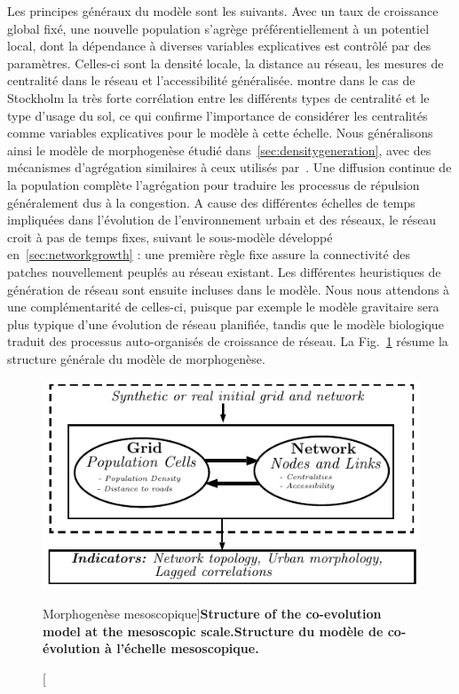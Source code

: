 {Les principes généraux du modèle sont les suivants. Avec un taux de croissance global fixé, une nouvelle population s'agrège préférentiellement à un potentiel local, dont la dépendance à diverses variables explicatives est contrôlé par des paramètres. Celles-ci sont la densité locale, la distance au réseau, les mesures de centralité dans le réseau et l'accessibilité généralisée. \cite{doi:10.1080/13658816.2014.893347} montre dans le cas de Stockholm la très forte corrélation entre les différents types de centralité et le type d'usage du sol, ce qui confirme l'importance de considérer les centralités comme variables explicatives pour le modèle à cette échelle. Nous généralisons ainsi le modèle de morphogenèse étudié dans~\ref{sec:densitygeneration}, avec des mécanismes d'agrégation similaires à ceux utilisés par~\cite{raimbault2014hybrid}. Une diffusion continue de la population complète l'agrégation pour traduire les processus de répulsion généralement dus à la congestion. A cause des différentes échelles de temps impliquées dans l'évolution de l'environnement urbain et des réseaux, le réseau croit à pas de temps fixes, suivant le sous-modèle développé en~\ref{sec:networkgrowth} : une première règle fixe assure la connectivité des patches nouvellement peuplés au réseau existant. Les différentes heuristiques de génération de réseau sont ensuite incluses dans le modèle. Nous nous attendons à une complémentarité de celles-ci, puisque par exemple le modèle gravitaire sera plus typique d'une évolution de réseau planifiée, tandis que le modèle biologique traduit des processus auto-organisés de croissance de réseau. La Fig.~\ref{fig:mesocoevolmodel:workflow} résume la structure générale du modèle de morphogenèse.
}




\begin{figure}
	\includegraphics[width=\linewidth]{Figures/MesoCoEvol/mesocoevol}
	\caption[Morphogenesis at the mesoscopic scale][Morphogenèse mesoscopique]{\textbf{Structure of the co-evolution model at the mesoscopic scale.}\label{fig:mesocoevolmodel:workflow}}{\textbf{Structure du modèle de co-évolution à l'échelle mesoscopique.}\label{fig:mesocoevolmodel:workflow}}
\end{figure}



